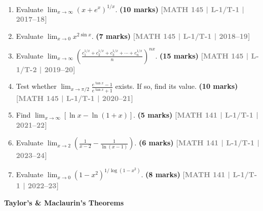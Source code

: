 \documentclass[12pt,a4paper]{article}
\newcommand{\yr}[1]{\hfill\textcolor{gray}{\small\textbf{[#1]}}}
\newcommand{\mk}[1]{\textcolor{orange!70!black}{\small\textbf{(#1 marks)}}}
\newcommand{\subtopic}[2]{%
  \vspace{10pt}
  \noindent\begin{tcolorbox}[colback=#1!8,colframe=#1,boxrule=0.6pt,arc=4pt,
    left=6pt,right=6pt,top=4pt,bottom=4pt]
    \small\bfseries\textcolor{#1}{#2}
  \end{tcolorbox}
  \vspace{2pt}
}
\begin{document}
\begin{enumerate}
\item Evaluate $\displaystyle\lim_{x\to\infty}(x+e^{x})^{1/x}$.
\mk{10} \yr{MATH 145 | L-1/T-1 | 2017--18}

\item Evaluate $\displaystyle\lim_{x\to 0}x^{2\sin x}$.
\mk{7} \yr{MATH 145 | L-1/T-1 | 2018--19}

\item Evaluate $\displaystyle\lim_{x\to\infty}\!\left(\frac{c_{1}^{1/x}+c_{2}^{1/x}+c_{3}^{1/x}+\cdots+c_{n}^{1/x}}{n}\right)^{nx}$.
\mk{15} \yr{MATH 145 | L-1/T-2 | 2019--20}

\item Test whether $\displaystyle\lim_{x\to\pi/2}\frac{e^{\tan x}-1}{e^{\tan x}+1}$ exists. If so, find its value.
\mk{10} \yr{MATH 145 | L-1/T-1 | 2020--21}

\item Find $\displaystyle\lim_{x\to\infty}[\ln x-\ln(1+x)]$.
\mk{5} \yr{MATH 141 | L-1/T-1 | 2021--22}

\item Evaluate $\displaystyle\lim_{x\to 2}\!\left(\frac{1}{x-2}-\frac{1}{\ln(x-1)}\right)$.
\mk{6} \yr{MATH 141 | L-1/T-1 | 2023--24}

\item Evaluate $\displaystyle\lim_{x\to 0}(1-x^{2})^{1/\log(1-x^{2})}$.
\mk{8} \yr{MATH 141 | L-1/T-1 | 2022--23}


\end{enumerate}

\subtopic{cA}{Taylor's \& Maclaurin's Theorems}
\label{sub:s1-taylor}
\end{document}
